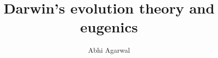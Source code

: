 \documentclass[11pt, oneside]{article}
\title{Darwin's evolution theory and eugenics}
\author{Abhi Agarwal}
\date{}
\begin{document}
\maketitle


\par 
\end{document}
